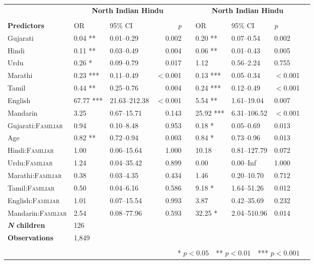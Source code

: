 \begin{table}[ht]
\begin{threeparttable}
\begin{tabular}{lllrllllr}
& \multicolumn{3}{c}{\textbf{North Indian Hindu}\tnote{a}} & & \multicolumn{3}{c}{\textbf{North Indian Hindu}\tnote{a}} \\
\cline{2-4} \cline{6-8} \\[-.75em]
\textbf{Predictors} & OR & 95\% CI & \textit{p} & & OR & 95\% CI & \textit{p} \\ 
\midrule
 Gujarati & 0.04 ** & 0.01--0.29 & 0.002 &  & 0.20 ** & 0.07--0.54 & 0.002 \\ 
 Hindi & 0.11 ** & 0.03--0.49 & 0.004 &  & 0.06 ** & 0.01--0.43 & 0.005 \\ 
 Urdu & 0.26 * & 0.09--0.79 & 0.017 &  & 1.12 & 0.56--2.24 & 0.755 \\ 
 Marathi & 0.23 *** & 0.11--0.49 & $<$0.001 &  & 0.13 *** & 0.05--0.34 & $<$0.001 \\ 
 Tamil & 0.44 ** & 0.25--0.76 & 0.004 &  & 0.24 *** & 0.12--0.49 & $<$0.001 \\ 
 English & 67.77 *** & 21.63--212.38 & $<$0.001 &  & 5.54 ** & 1.61--19.04 & 0.007 \\ 
 Mandarin & 3.25 & 0.67--15.71 & 0.143 &  & 25.92 *** & 6.31--106.52 & $<$0.001 \\ 
 Gujarati:\textsc{Familiar} & 0.94 & 0.10--8.48 & 0.953 &  & 0.18 * & 0.05--0.69 & 0.013 \\ 
 Age\tnote{b} & 0.82 ** & 0.72--0.94 & 0.003 &  & 0.84 * & 0.73--0.96 & 0.013 \\ 
 Hindi:\textsc{Familiar} & 1.00 & 0.06--15.64 & 1.000 &  & 10.18 & 0.81--127.79 & 0.072 \\ 
 Urdu:\textsc{Familiar} & 1.24 & 0.04--35.42 & 0.899 &  & 0.00 & 0.00--Inf & 1.000 \\ 
 Marathi:\textsc{Familiar} & 0.38 & 0.03--4.35 & 0.434 &  & 1.46 & 0.20--10.70 & 0.712 \\ 
 Tamil:\textsc{Familiar} & 0.50 & 0.04--6.16 & 0.586 &  & 9.18 * & 1.64--51.26 & 0.012 \\ 
 English:\textsc{Familiar} & 1.01 & 0.07--15.54 & 0.993 &  & 3.87 & 0.42--35.69 & 0.232 \\ 
 Mandarin:\textsc{Familiar} & 2.54 & 0.08--77.96 & 0.593 &  & 32.25 * & 2.04--510.96 & 0.014 \\ 
\midrule
\bfseries{\textit{N} children}\tnote{c} & 126   &  &  &  &  &  &  \\
\textbf{Observations}\tnote{d} & 1,849  &  &  &  &  &  &  \\
\bottomrule\\[-.75em]
\multicolumn{8}{r}{* $p<0.05$~~** $p<0.01$~~*** $p<0.001$}\\

\end{tabular}
\end{threeparttable}
\end{table}
